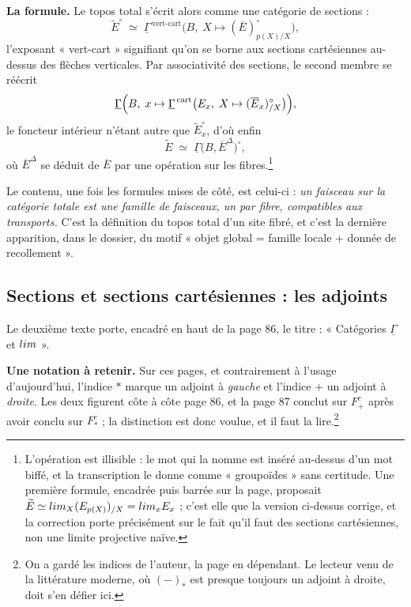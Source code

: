 \documentclass[11pt,a4paper]{article}
\begin{document}
\textbf{La formule.} Le topos total s'écrit alors comme une catégorie de
sections :
\[
  \widetilde{E}^{\circ} \;\simeq\;
  \underline{\Gamma}^{\,\text{vert-cart}}
  \bigl( B,\; X \mapsto (\overline{E})^{\circ}_{p(X)/X} \bigr) ,
\]
l'exposant « vert-cart » signifiant qu'on se borne aux sections cartésiennes
au-dessus des flèches verticales. Par associativité des sections, le second
membre se réécrit
\[
  \underline{\Gamma}\Bigl( B,\; x \mapsto
  \underline{\Gamma}^{\,\mathrm{cart}}\bigl( E_{x},\;
  X \mapsto (\overline{E}_{x})^{\circ}_{/X} \bigr) \Bigr) ,
\]
le foncteur intérieur n'étant autre que $\widetilde{E}^{\circ}_{x}$, d'où
enfin
\[
  \widetilde{E} \;\simeq\;
  \underline{\Gamma}\bigl( B, \overline{E}^{\Delta} \bigr)^{\circ} ,
\]
où $\overline{E}^{\Delta}$ se déduit de $\overline{E}$ par une opération sur
les fibres.\footnote{L'opération est illisible : le mot qui la nomme est
inséré au-dessus d'un mot biffé, et la transcription le donne comme
« groupoïdes » sans certitude. Une première formule, encadrée puis barrée sur
la page, proposait $\widetilde{E} \simeq \varprojlim_{X}(E_{p(X)})_{/X} =
\varprojlim_{x} E_{x}$ ; c'est elle que la version ci-dessus corrige, et la
correction porte précisément sur le fait qu'il faut des sections cartésiennes,
non une limite projective naïve.}

Le contenu, une fois les formules mises de côté, est celui-ci : \emph{un
faisceau sur la catégorie totale est une famille de faisceaux, un par fibre,
compatibles aux transports.} C'est la définition du topos total d'un site
fibré, et c'est la dernière apparition, dans le dossier, du motif « objet
global = famille locale + donnée de recollement ».

\subsection*{Sections et sections cartésiennes : les adjoints}

Le deuxième texte porte, encadré en haut de la page 86, le titre :
« Catégories $\underline{\Gamma}$ et $\varprojlim$ ».


\textbf{Une notation à retenir.} Sur ces pages, et contrairement à
l'usage d'aujourd'hui, l'indice $*$ marque un adjoint à \emph{gauche} et
l'indice $+$ un adjoint à \emph{droite}. Les deux figurent côte à côte page 86,
et la page 87 conclut sur $F^{c}_{+}$ après avoir conclu sur $F^{c}_{*}$ ; la
distinction est donc voulue, et il faut la lire.\footnote{On a gardé les
indices de l'auteur, la page en dépendant. Le lecteur venu de la littérature
moderne, où $(-)_{*}$ est presque toujours un adjoint à droite, doit s'en
défier ici.}
\end{document}

